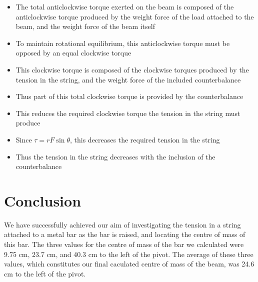 \documentclass[a4paper,11pt]{article}
\begin{document}
\begin{itemize}
\item The total anticlockwise torque exerted on the beam is composed of the anticlockwise torque
	produced by the weight force of the load attached to the beam, and the weight force of the beam itself
\item To maintain rotational equilibrium, this anticlockwise torque must be opposed by an equal clockwise torque
\item This clockwise torque is composed of the clockwise torques produced by the tension in the string, and the weight force of the included counterbalance
\item Thus part of this total clockwise torque is provided by the counterbalance
\item This reduces the required clockwise torque the tension in the string must produce
\item Since $\tau = r F \sin{\theta}$, this decreases the required tension in the string
\item Thus the tension in the string decreases with the inclusion of the counterbalance
\end{itemize}


\section{Conclusion}

We have successfully achieved our aim of investigating the tension in a string
attached to a metal bar as the bar is raised, and locating the centre of mass of
this bar. The three values for the centre of mass of the bar we calculated were
9.75 cm, 23.7 cm, and 40.3 cm to the left of the pivot. The average of these
three values, which constitutes our final caculated centre of mass of the beam,
was 24.6 cm to the left of the pivot.
\end{document}
